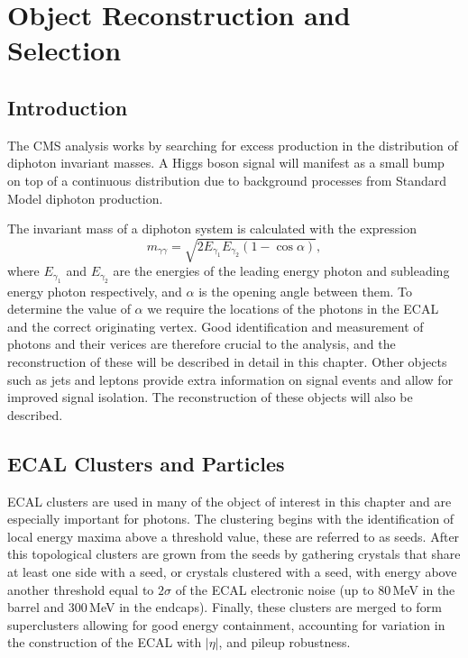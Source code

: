 \chapter{Object Reconstruction and Selection}
\label{chap:object_reco}

\newpage

\section{Introduction}

The CMS \Hgg analysis works by searching for excess production in the distribution of diphoton invariant masses. A Higgs boson signal will manifest as a small bump on top of a continuous distribution due to background processes from Standard Model diphoton production.

The invariant mass of a diphoton system is calculated with the expression
\begin{equation}
    m_{\gamma\gamma} = \sqrt{2E_{\gamma_1}E_{\gamma_2}(1-\cos{\alpha})},
\end{equation}
where $E_{\gamma_1}$ and $E_{\gamma_2}$ are the energies of the leading energy photon and subleading energy photon respectively, and $\alpha$ is the opening angle between them. 
To determine the value of $\alpha$ we require the locations of the photons in the ECAL and the correct originating vertex. 
Good identification and measurement of photons and their verices are therefore crucial to the analysis, and the reconstruction of these will be described in detail in this chapter. 
Other objects such as jets and leptons provide extra information on signal events and allow for improved signal isolation. The reconstruction of these objects will also be described.

\section{ECAL Clusters and Particles}

ECAL clusters are used in many of the object of interest in this chapter and are especially important for photons. 
The clustering \cite{cmsEcalCalibration} begins with the identification of local energy maxima above a threshold value, these are referred to as seeds. 
After this topological clusters are grown from the seeds by gathering crystals that share at least one side with a seed, or crystals clustered with a seed, with energy above another threshold equal to $2\sigma$ of the ECAL electronic noise (up to 80\,MeV in the barrel and 300\,MeV in the endcaps).
Finally, these clusters are merged to form superclusters allowing for good energy containment, accounting for variation in the construction of the ECAL with $|\eta|$, and pileup robustness.



